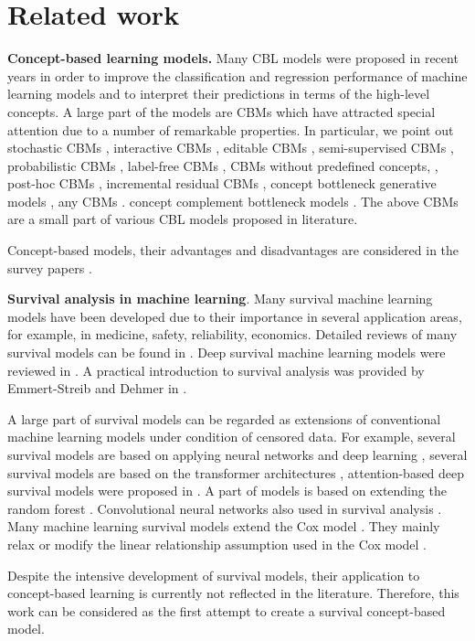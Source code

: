 \section{Related work}
\textbf{Concept-based learning models.} Many CBL models were proposed in
recent years \cite{kim2018interpretability,Sheth-Kahou-23,yeh2020completeness}
in order to improve the classification and regression performance of machine
learning models and to interpret their predictions in terms of the high-level
concepts. A large part of the models are CBMs \cite{koh2020concept} which have
attracted special attention due to a number of remarkable properties. In
particular, we point out stochastic CBMs \cite{vandenhirtz2024stochastic},
interactive CBMs \cite{chauhan2023interactive}, editable CBMs
\cite{hu2024editable}, semi-supervised CBMs \cite{hu2024semi}, probabilistic
CBMs \cite{kim2023probabilistic}, label-free CBMs \cite{oikarinen2023label},
CBMs without predefined concepts, \cite{Wang-Junlin-Chen-24}
\cite{schrodi2024concept}, post-hoc CBMs \cite{yuksekgonul2022post},
incremental residual CBMs \cite{shang2024incremental}, concept bottleneck
generative models \cite{ismail2023concept}, any CBMs
\cite{dominici2024anycbms}. concept complement bottleneck models
\cite{Wang-Junlin-Chen-24}. The above CBMs are a small part of various CBL
models proposed in literature.

Concept-based models, their advantages and disadvantages are considered in the
survey papers
\cite{Gupta-Narayanan-24,poeta2023concept,Aysel-etal-25,lee2023neural,mahinpei2021promises}%
.

\textbf{Survival analysis in machine learning}. Many survival machine learning
models have been developed \cite{Wang-Li-Reddy-2019} due to their importance
in several application areas, for example, in medicine, safety, reliability,
economics. Detailed reviews of many survival models can be found in
\cite{Wang-Li-Reddy-2019,salerno2023high,Wiegrebe:2024aa}. Deep survival
machine learning models were reviewed in \cite{chen2024introduction}. A
practical introduction to survival analysis was provided by Emmert-Streib and
Dehmer in \cite{EmmertStreib-Dehmer-19}.

A large part of survival models can be regarded as extensions of conventional
machine learning models under condition of censored data. For example, several
survival models are based on applying neural networks and deep learning
\cite{chen2024introduction,Katzman-etal-2018,Luck-etal-2017,Nezhad-etal-2018,ren2019deep,Steingrimsson-Morrison-20,Tarkhan-etal-21,Yao-Zhu-Zhu-Huang-2017,Zhong-Mueller-Wang-21}%
, several survival models are based on the transformer architectures
\cite{Chatha-etal-22,hu2021transformer,Li-Zhu-Yao-Huang-22,Lv-Lin-etal-22,Shen-liu-etal-22,tang2023explainable,Wang-Sun-22}%
, attention-based deep survival models were proposed in
\cite{Li-Krivtsov-Arora-22,Sun-Dong-etal-21}. A part of models is based on
extending the random forest \cite{Ibrahim-etal-2008,Wright-etal-2017}.
Convolutional neural networks also used in survival analysis
\cite{Haarburger-etal-2018}. Many machine learning survival models extend the
Cox model \cite{Cox-1972}. They mainly relax or modify the linear relationship
assumption used in the Cox model
\cite{Widodo-Yang-2011,Witten-Tibshirani-2010}.

Despite the intensive development of survival models, their application to
concept-based learning is currently not reflected in the literature.
Therefore, this work can be considered as the first attempt to create a
survival concept-based model.